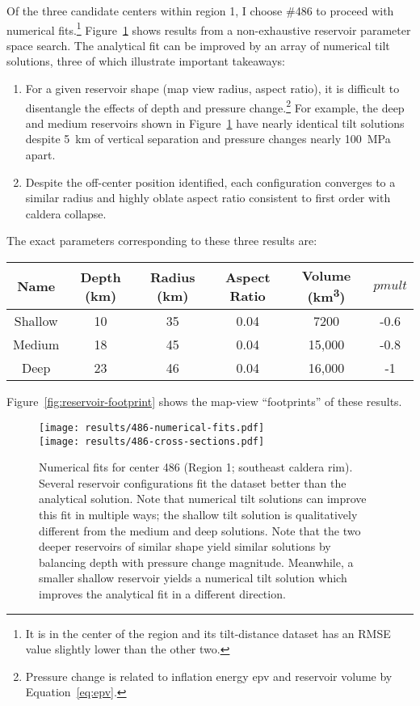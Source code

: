 Of the three candidate centers within region 1, I choose \#486 to proceed with numerical fits.\footnote{It is in the center of the region and its tilt-distance dataset has an \acs{RMSE} value slightly lower than the other two.} Figure~\ref{fig:486-numerical-fits} shows results from a non-exhaustive reservoir parameter space search. The analytical fit can be improved by an array of numerical tilt solutions, three of which illustrate important takeaways:
\begin{enumerate}
    \item For a given reservoir shape (map view radius, aspect ratio), it is difficult to disentangle the effects of depth and pressure change.\footnote{Pressure change is related to inflation energy \acs{epv} and reservoir volume by Equation~\eqref{eq:epv}.} For example, the deep and medium reservoirs shown in Figure~\ref{fig:486-numerical-fits} have nearly identical tilt solutions despite \qty{5}{km} of vertical separation and pressure changes nearly \qty{100}{\mega\Pa} apart. 
    \item Despite the off-center position identified, each configuration converges to a similar radius and highly oblate aspect ratio consistent to first order with caldera collapse.
\end{enumerate}

The exact parameters corresponding to these three results are:
\begin{center}
\begin{tabular}{cccccc}
    Name & Depth (km) & Radius (km) & Aspect Ratio & Volume (\unit{\km\cubed}) & $pmult$\\
    \hline
    Shallow & 10 & 35 & 0.04 & 7200 & -0.6\\
    Medium & 18 & 45 & 0.04 & 15,000 & -0.8\\
    Deep & 23 & 46 & 0.04 & 16,000& -1
\end{tabular}
\end{center}
Figure~\ref{fig:reservoir-footprint} shows the map-view ``footprints'' of these results.

\begin{figure}
    \texttt{[image: results/486-numerical-fits.pdf]}\\
    \texttt{[image: results/486-cross-sections.pdf]}%
    \caption[Numerical parameter fits (center 486)]{Numerical fits for center 486 (Region 1; southeast caldera rim). Several reservoir configurations fit the dataset better than the analytical solution. Note that numerical tilt solutions can improve this fit in multiple ways; the shallow tilt solution is qualitatively different from the medium and deep solutions. Note that the two deeper reservoirs of similar shape yield similar solutions by balancing depth with pressure change magnitude. Meanwhile, a smaller shallow reservoir yields a numerical tilt solution which improves the analytical fit in a different direction.}
    \label{fig:486-numerical-fits}
\end{figure}

